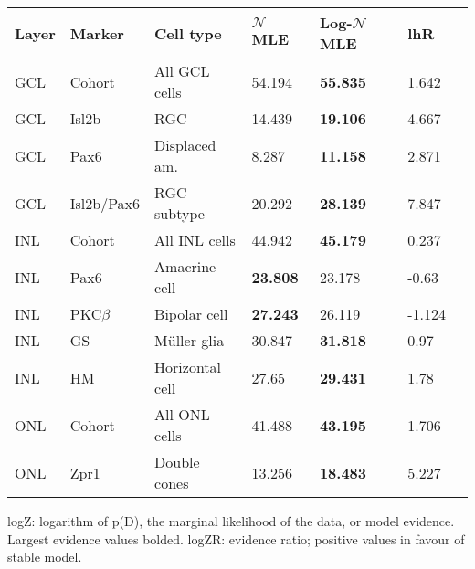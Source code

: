 \begin{table}[!ht]
    \begin{tabular}{|l|l|l|l|l|l|l|} 
        \hline
        {\bf Layer} & {\bf Marker} & {\bf Cell type} & {\bf $\mathcal{N}$ MLE} & {\bf Log-$\mathcal{N}$ MLE} & {\bf lhR}\\ \hline \hline
        GCL & Cohort & All GCL cells & 54.194 & {\bf 55.835} & 1.642\\ \hline
        GCL & Isl2b & RGC & 14.439 & {\bf 19.106} & 4.667\\ \hline
        GCL & Pax6 & Displaced am. &  8.287 & {\bf 11.158} & 2.871\\ \hline
        GCL & Isl2b/Pax6 & RGC subtype & 20.292 & {\bf 28.139} & 7.847\\ \hline
        INL & Cohort & All INL cells & 44.942 & {\bf 45.179} & 0.237\\ \hline
        INL & Pax6 & Amacrine cell & {\bf 23.808} & 23.178 & -0.63\\ \hline
        INL & PKC$\beta$ & Bipolar cell & {\bf 27.243} & 26.119 & -1.124\\ \hline
        INL & GS & M\"{u}ller glia & 30.847 & {\bf 31.818} & 0.97\\ \hline
        INL & HM & Horizontal cell & 27.65 & {\bf 29.431} & 1.78\\ \hline
        ONL & Cohort & All ONL cells & 41.488 & {\bf 43.195} & 1.706\\ \hline
        ONL & Zpr1 & Double cones & 13.256 & {\bf 18.483} & 5.227\\ \hline
    \end{tabular}
   
    \begin{flushleft}logZ: logarithm of p(D), the marginal likelihood of the data, or model evidence.  Largest evidence values bolded. logZR: evidence ratio; positive values in favour of stable model.
    \end{flushleft}
    \label{lineage_lhratio}
\end{table}



